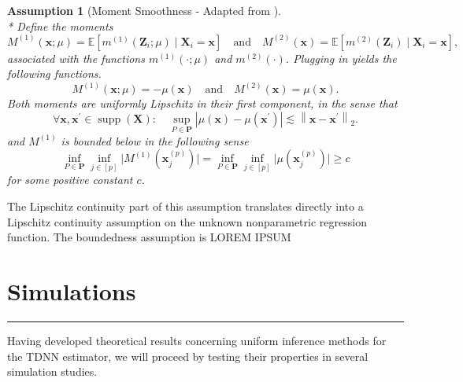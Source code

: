 \documentclass[letterpaper,10pt]{article}
\numberwithin{equation}{section}
\numberwithin{thm}{section}
\numberwithin{lem}{section}
\numberwithin{cor}{section}
\newtheorem{asm}{Assumption}
\newcommand{\E}{\mathbb{E}}
\newcommand{\1}{\mathbbm{1}}
\begin{document}
\begin{asm}[Moment Smoothness - Adapted from \citet{ritzwoller_uniform_2024}]\mbox{}\\*
	Define the moments
	\begin{equation}
		M^{(1)}(\mathbf{x} ; \mu)
		= \E\left[m^{(1)}\left(\mathbf{Z}_i ; \mu\right) \mid \mathbf{X}_i= \mathbf{x}\right]
		\quad \text{and} \quad
		M^{(2)}(\mathbf{x})
		= \E\left[m^{(2)}\left(\mathbf{Z}_i\right) \mid \mathbf{X}_i = \mathbf{x}\right],
	\end{equation}
	associated with the functions $m^{(1)}(\cdot ; \mu)$ and $m^{(2)}(\cdot)$.
	Plugging in yields the following functions.
	\begin{equation}
		M^{(1)}(\mathbf{x} ; \mu)
		= -\mu(\mathbf{x})
		\quad \text{and} \quad
		M^{(2)}(\mathbf{x})
		= \mu(\mathbf{x}).
	\end{equation}
	Both moments are uniformly Lipschitz in their first component, in the sense that
	\begin{equation}
		\forall \mathbf{x}, \mathbf{x}^{\prime} \in \operatorname{supp}\left(\mathbf{X}\right): \quad
		\sup _{P \in \mathbf{P}}
		\left|\mu(\mathbf{x})-\mu\left(\mathbf{x}^{\prime}\right)\right|
		\lesssim\left\|\mathbf{x}-\mathbf{x}^{\prime}\right\|_{2}.
	\end{equation}
	and $M^{(1)}$ is bounded below in the following sense
	\begin{equation}
		\inf_{P \in \mathbf{P}} \inf_{j \in [p]} \Big|M^{(1)}\left(\mathbf{x}^{(p)}_{j}\right) \Big|
		= \inf_{P \in \mathbf{P}} \inf_{j \in [p]} \Big|\mu\left(\mathbf{x}^{(p)}_{j}\right) \Big| \geq c
	\end{equation}
	for some positive constant $c$.
\end{asm}

The Lipschitz continuity part of this assumption translates directly into a Lipschitz continuity assumption on the unknown nonparametric regression function.
The boundedness assumption is
	{\color{red} LOREM IPSUM}

\newpage
\section{Simulations}\label{Simulations}
\hrule

Having developed theoretical results concerning uniform inference methods for the TDNN estimator, we will proceed by testing their properties in several simulation studies.
\end{document}
